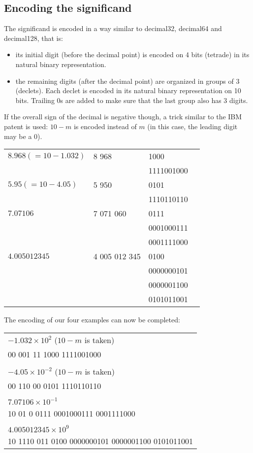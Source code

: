\documentclass[final,leqno,onefignum,onetabnum]{siamltex1213}
\begin{document}
\subsection{Encoding the significand}

The significand is encoded in a way similar to decimal32, decimal64 and decimal128, that is:

\begin{itemize}
\item its initial digit (before the decimal point) is encoded on 4 bits (tetrade) in its natural binary representation.
\item the remaining digits (after the decimal point) are organized in groups of 3 (declets). Each declet is encoded in its natural binary representation on 10 bits. Trailing 0s are added to make sure that the last group also has 3 digits.
\end{itemize}

If the overall sign of the decimal is negative though, a trick similar to the IBM patent is used: $10-m$ is encoded instead of $m$ (in this case, the leading digit may be a 0).

\begin{tabular}{|l|l|l|l}
\hline
$8.968 (=10-1.032)$ & 8 968 & 1000 \\
& & 1111001000 \\
\hline
$5.95 (=10-4.05)$ & 5 950 & 0101 \\
& & 1110110110\\
\hline
$7.07106$ & 7 071 060 & 0111 \\
& & 0001000111\\
& & 0001111000\\
\hline
$4.005012345$ & 4 005 012 345 & 0100 \\
& & 0000000101\\
& & 0000001100\\
& & 0101011001\\
\hline
\end{tabular}

The encoding of our four examples can now be completed:

\begin{tabular}{l}
$- 1.032 \times 10^2$ ($10-m$ is taken)\\
00 001 11 1000 1111001000\\
\\
$-4.05 \times 10^{-2}$ ($10-m$ is taken)\\
00 110 00 0101 1110110110\\
\\
$7.07106 \times 10^{-1}$\\
10 01 0 0111 0001000111 0001111000\\
\\
$4.005012345 \times 10^9$\\
10 1110 011 0100 0000000101 0000001100 0101011001\\
\end{tabular}
\end{document}
